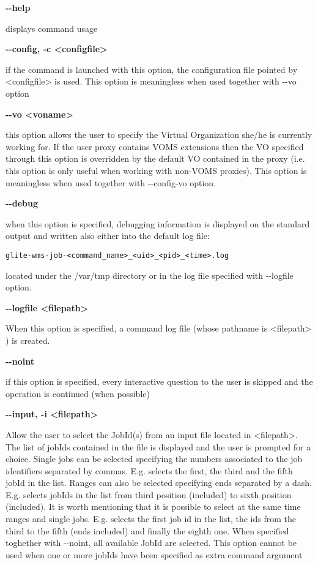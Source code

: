 \textbf{-{}-help}

displays command usage




\textbf{-{}-config, -c <configfile>}

if the command is launched with this option, the configuration file pointed by <configfile> is used. This option is meaningless when used together with -{}-vo option




\textbf{-{}-vo <voname>}

this option allows the user to specify the Virtual Organization she/he is currently working for.
If the user proxy contains VOMS extensions then the VO specified through this option is overridden by the
default VO contained in the proxy (i.e. this option is only useful when working with non-VOMS proxies).
This option is meaningless when used together with -{}-config-vo option.




\textbf{-{}-debug}

when this option is specified, debugging information is displayed on the standard output and written also either into the default log file:


\begin{verbatim}
glite-wms-job-<command_name>_<uid>_<pid>_<time>.log
\end{verbatim}

located under the /var/tmp  directory or in the log file specified with -{}-logfile option.




\textbf{-{}-logfile <filepath>}

When this option is specified, a command log file (whose pathname is <filepath> ) is created.



\textbf{-{}-noint}

if this option is specified, every interactive question to the user is skipped and the operation 
is continued (when possible)





\textbf{-{}-input, -i <filepath>}

Allow the user to select the JobId(s) from an input file located in <filepath>.
The list of jobIds contained in the file is displayed and the user is prompted for a choice. Single 
jobs can be selected specifying the numbers associated to the job identifiers separated by commas. 
E.g. selects the first, the third and the fifth jobId in the list.
Ranges can also be selected specifying ends separated by a dash. E.g. selects jobIds in the list 
from third position (included) to sixth position (included). It is worth mentioning that it is 
possible to select at the same time ranges and single jobs. E.g. selects the first job id in the list, 
the ids from the third to the fifth (ends included) and finally the eighth one.
When specified toghether with -{}-noint, all available JobId are selected.
 This option cannot be used when one or more jobIds have been specified as extra command argument





